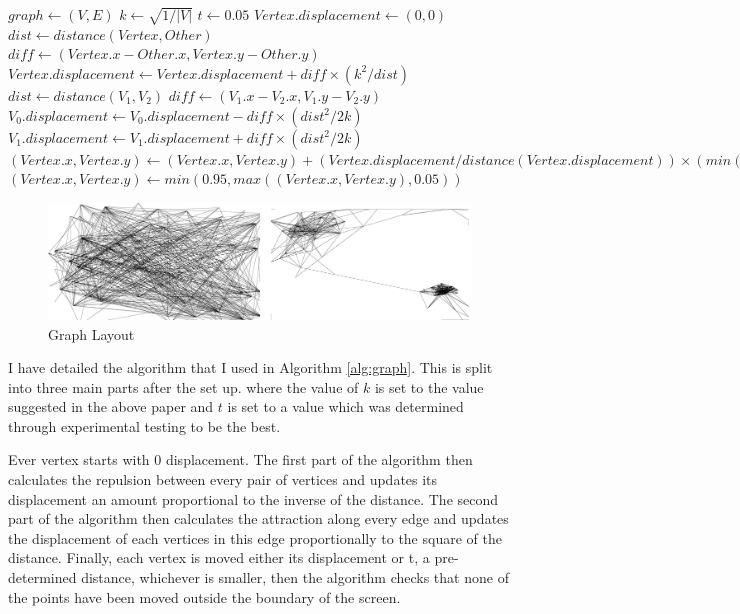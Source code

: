 \documentclass[12pt,a4paper]{article}
\begin{document}
\begin{algorithm}[htb]
\caption{Graph sprint-directed layout algorithm}
\label{alg:graph}
\begin{algorithmic}
\State $graph \gets (V, E)$ 
\State $k \gets \sqrt{1/|V|}$
\State $t \gets 0.05$
	\State $Vertex.displacement \gets (0,0)$
		\State $dist \gets distance(Vertex, Other)$ 
		\State $diff \gets (Vertex.x-Other.x, Vertex.y-Other.y)$
		\State $Vertex.displacement \gets Vertex.displacement + diff \times (k^{2}/dist)$
	\EndFor
\EndFor
{} 
	\State $dist \gets distance(V_{1}, V_{2})$
	\State $diff \gets (V_{1}.x-V_{2}.x, V_{1}.y-V_{2}.y)$
	\State $V_{0}.displacement \gets V_{0}.displacement - diff \times (dist^{2}/2k)$
	\State $V_{1}.displacement \gets V_{1}.displacement + diff \times (dist^{2}/2k)$
\EndFor
{}
	\State $(Vertex.x, Vertex.y) \gets (Vertex.x, Vertex.y) + (Vertex.displacement/distance(Vertex.displacement)) \times (min(distance(Vertex.displacement), t))$ 
	\State $(Vertex.x, Vertex.y) \gets min(0.95, max((Vertex.x, Vertex.y), 0.05))$ 
\EndFor
\end{algorithmic}
\end{algorithm}

\begin{figure}[htb]
\caption{Graph Layout}
\label{fig:layout}
\centering
\includegraphics[scale=0.12]{Pygame.png}
\end{figure}

I have detailed the algorithm that I used in Algorithm \ref{alg:graph}. This is split into three main parts after the set up. where the value of $k$ is set to the value suggested in the above paper and $t$ is set to a value which was determined through experimental testing to be the best.

Ever vertex starts with 0 displacement. The first part of the algorithm then calculates the repulsion between every pair of vertices and updates its displacement an amount proportional to the inverse of the distance. The second part of the algorithm then calculates the attraction along every edge and updates the displacement of each vertices in this edge proportionally to the square of the distance. Finally, each vertex is moved either its displacement or t, a pre-determined distance, whichever is smaller, then the algorithm checks that none of the points have been moved outside the boundary of the screen.
\end{document}
